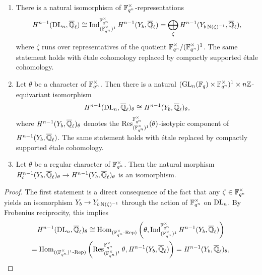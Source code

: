 \documentclass[../main.tex]{subfiles}
\begin{document}
\begin{lem}\label{lem:ResultsAboutYb}\leavevmode
  \begin{enumerate}
    \item There is a natural isomorphism of $\mathbb{F}_{q^n}^\times$-representations
      \begin{equation*}
         \mathit H^{n-1}(\mathrm{DL}_n, {\overline {\mathbb{Q}}_\ell}) \cong
         \operatorname{Ind}_{(\mathbb{F}_{q^n}^\times)^1}^{\mathbb{F}_{q^n}^\times}\mathit H^{n-1}(Y_b,
         {\overline {\mathbb{Q}}_\ell}) = \bigoplus_{\zeta} \mathit H^{n-1}(Y_{b
         \operatorname{N}(\zeta)^{-1}}, {\overline {\mathbb{Q}}_\ell}),
      \end{equation*}
      where $\zeta$ runs over representatives of the quotient
      $\mathbb{F}_{q^n}^\times/(\mathbb{F}_{q^n}^\times)^1$. The same
      statement holds with \'etale cohomology replaced by
      compactly supported \'etale cohomology.
    \item Let $\theta$ be a character of $\mathbb{F}_{q^n}^\times$.
      Then there is a natural $(\operatorname{GL}_n(\mathbb{F}_q) \times
      \mathbb{F}_{q^n}^\times)^1 \times n\mathbb{Z}$-equivariant isomorphism 
      \begin{equation*}
        \mathit H^{n-1}(\mathrm{DL}_n, {\overline {\mathbb{Q}}_\ell})_\theta \cong 
        \mathit H^{n-1}(Y_b, {\overline {\mathbb{Q}}_\ell})_\theta,
      \end{equation*}
      where $\mathit H^{n-1}(Y_b, {\overline {\mathbb{Q}}_\ell})_\theta$ denotes the
      $\operatorname{Res}_{(\mathbb{F}_{q^n}^\times)^1}^{\mathbb{F}_{q^n}^\times} (\theta)$-isotypic component of
      $\mathit H^{n-1}(Y_b, {\overline {\mathbb{Q}}_\ell})$.
      The same statement holds with \'etale replaced by compactly supported
      \'etale cohomology.
    \item Let $\theta$ be a regular character of $\mathbb{F}_{q^n}^\times$. Then 
      the natural morphism $\mathit H_{\mathrm{c}}^{n-1}(Y_b, {\overline {\mathbb{Q}}_\ell})_\theta \to \mathit H^{n-1}(Y_b,
      {\overline {\mathbb{Q}}_\ell})_\theta$
      is an isomorphism.
  \end{enumerate}
\begin{proof}
  The first statement is a direct consequence of the fact that any $\zeta \in
  \mathbb{F}_{q^n}^{\times}$ yields an isomorphism $Y_b \to Y_{b \operatorname{N}(\zeta)^{-1}}$
  through the action of $\mathbb{F}_{q^n}^\times$ on $\mathrm{DL}_n$. 
  By Frobenius reciprocity, this implies
\begin{multline*}
      \mathit H^{n-1}(\mathrm{DL}_n, {\overline {\mathbb{Q}}_\ell})_\theta \cong 
      \operatorname{Hom}_{{({\mathbb{F}_{q^n}^\times}\textnormal-\allowbreak\mathrm{Rep})}}\left(\theta,
      \operatorname{Ind}_{(\mathbb{F}_{q^n}^\times)^1}^{\mathbb{F}_{q^n}^\times}\mathit H^{n-1}(Y_b, {\overline {\mathbb{Q}}_\ell}) \right) \\
      = 
      \operatorname{Hom}_{{({(\mathbb{F}_{q^n}^\times)^1}\textnormal-\allowbreak\mathrm{Rep})}}
      \left(\operatorname{Res}^{\mathbb{F}_{q^n}^\times}_{(\mathbb{F}_{q^n}^\times)^1} \theta,
        \mathit H^{n-1}(Y_b, {\overline {\mathbb{Q}}_\ell}) \right) = \mathit H^{n-1}(Y_b, {\overline {\mathbb{Q}}_\ell})_\theta,
\end{multline*}

\end{proof}
\end{lem}
\end{document}
